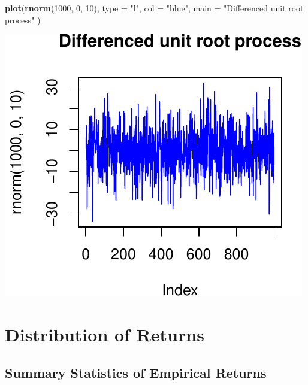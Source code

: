 \documentclass[11pt,]{article}
\newenvironment{Shaded}{\begin{snugshade}}{\end{snugshade}}
\newcommand{\KeywordTok}[1]{\textcolor[rgb]{0.13,0.29,0.53}{\textbf{#1}}}
\newcommand{\DataTypeTok}[1]{\textcolor[rgb]{0.13,0.29,0.53}{#1}}
\newcommand{\DecValTok}[1]{\textcolor[rgb]{0.00,0.00,0.81}{#1}}
\newcommand{\StringTok}[1]{\textcolor[rgb]{0.31,0.60,0.02}{#1}}
\newcommand{\NormalTok}[1]{#1}
\begin{document}
\begin{Shaded}
\begin{Highlighting}[]
\KeywordTok{plot}\NormalTok{(}\KeywordTok{rnorm}\NormalTok{(}\DecValTok{1000}\NormalTok{, }\DecValTok{0}\NormalTok{, }\DecValTok{10}\NormalTok{),}
     \DataTypeTok{type =} \StringTok{"l"}\NormalTok{,}
     \DataTypeTok{col =} \StringTok{"blue"}\NormalTok{,}
     \DataTypeTok{main =} \StringTok{"Differenced unit root process"}
\NormalTok{     )}
\end{Highlighting}
\end{Shaded}

\begin{center}\includegraphics{FMC_T4_PhD_Fin_Time_Series_files/figure-latex/unit_root-2} \end{center}

\section{Distribution of Returns}\label{distribution-of-returns}

\subsection{Summary Statistics of Empirical
Returns}\label{summary-statistics-of-empirical-returns}
\end{document}
